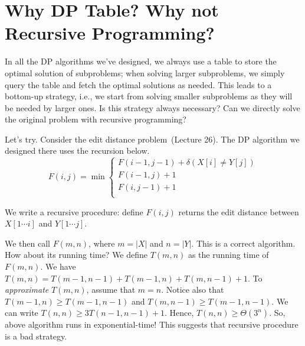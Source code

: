 \setcounter{definition}{0} \setcounter{property}{0} \setcounter{claim}{0} \setcounter{fact}{0} \setcounter{corollary}{0} \setcounter{figure}{0}
\section{Why DP Table? Why not Recursive Programming?}

In all the DP algorithms we've designed, we always use a table to store
the optimal solution of subproblems; when solving larger
subproblems, we simply query the table and fetch the optimal
solutions as needed. 
This leads to a bottom-up strategy, i.e., we start from solving
smaller subproblems as they will be needed by larger ones.
Is this strategy always necessary?
Can we directly solve the original problem with recursive programming?

Let's try.
Consider the edit distance problem~(Lecture 26).
The DP algorithm we designed there uses the recursion below.
\begin{displaymath}
F(i,j) = \min\left\{
	\begin{array}{llll}
	F(i-1,j-1) + \delta(X[i] \neq Y[j]) \\
	F(i-1,j) + 1 \\
	F(i,j-1) + 1 \\
	\end{array}
\right.
\end{displaymath}

We write a recursive procedure: define $F(i,j)$
returns the edit distance between $X[1\cdots i]$ and $Y[1\cdots j]$.

\begin{algorithmblock}[0.8\textwidth]
	\xxx
	\xxx
	\xxx
	\xxx
	\xxx
	\xxx
	\xxx
\end{algorithmblock}

We then call $F(m,n)$, where $m=|X|$ and $n=|Y|$.
This is a correct algorithm.
How about its running time?
We define $T(m,n)$ as the running time of $F(m,n)$.
We have $T(m,n) = T(m-1,n-1) + T(m-1,n) + T(m,n-1) + 1$.
To \emph{approximate} $T(m,n)$, assume that $m=n$.
Notice also that $T(m-1,n) \ge T(m-1,n-1)$
and $T(m,n-1) \ge T(m-1,n-1)$.
We can write $T(n,n) \ge 3T(n-1,n-1) + 1$.
Hence, $T(n,n) \ge \Theta(3^n)$.
So, above algorithm runs in exponential-time!
This suggests that recursive procedure is a bad strategy.

